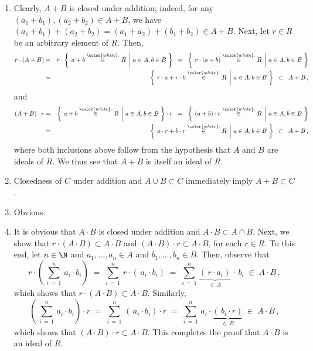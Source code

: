 \begin{enumerate}
\item
	Clearly, $A + B$ is closed under addition;
	indeed, for any $(a_{1} + b_{1}), (a_{2} + b_{2}) \in A + B$,
	we have $(a_{1} + b_{1}) + (a_{2} + b_{2}) = (a_{1} + a_{2}) + (b_{1} + b_{2}) \in A + B$.
	Next, let $r \in R$ be an arbitrary element of $R$. Then,
	\begin{eqnarray*}
	r \cdot (A+B)
	& = &
		r \cdot \left\{\;\left. a + b \overset{{\color{white}.}}{\in} R \;\,\right\vert\, a \in A, b \in B \;\right\}
	\;\; = \;\;
		\left\{\;\left. r \cdot (a + b) \overset{{\color{white}.}}{\in} R \;\,\right\vert\, a \in A, b \in B \;\right\}
	\\
	& = &
		\left\{\;\left. r \cdot a + r \cdot b \overset{{\color{white}.}}{\in} R \;\,\right\vert\, a \in A, b \in B \;\right\}
	\;\; \subset \;\;
		A + B\,,
	\end{eqnarray*}
	and
	\begin{eqnarray*}
	(A+B) \cdot r
	& = &
		\left\{\;\left. a + b \overset{{\color{white}.}}{\in} R \;\,\right\vert\, a \in A, b \in B \;\right\} \cdot r
	\;\; = \;\;
		\left\{\;\left. (a + b) \cdot r \overset{{\color{white}.}}{\in} R \;\,\right\vert\, a \in A, b \in B \;\right\}
	\\
	& = &
		\left\{\;\left. a \cdot r + b \cdot r \overset{{\color{white}.}}{\in} R \;\,\right\vert\, a \in A, b \in B \;\right\}
	\;\; \subset \;\;
		A + B\,,
	\end{eqnarray*}
	where both inclusions above follow from the hypothesis that $A$ and $B$ are ideals of $R$.
	We thus see that $A + B$ is itself an ideal of $R$.
\item
	Closedness of $C$ under addition and $A \cup B \subset C$ immediately imply $A + B \subset C$.
\item
	Obvious.
\item
	It is obvious that $A \cdot B$ is closed under addition and $A \cdot B \subset A \cap B$.
	Next, we show that
	$r \cdot (A \cdot B) \subset A \cdot B$ and
	$(A \cdot B) \cdot r \subset A \cdot B$, for each $r \in R$.
	To this end, let $n \in \N$ and $a_{1}, \ldots , a_{n} \in A$ and $b_{1}, \ldots , b_{n} \in B$.
	Then, observe that
	\begin{equation*}
	r \cdot \left(\, \overset{n}{\underset{i\,=\,1}{\sum}}\, a_{i} \cdot b_{i} \right)
	\; = \;
		\overset{n}{\underset{i\,=\,1}{\sum}}\, r \cdot \left(\, a_{i} \cdot b_{i} \right)
	\; = \;
		\overset{n}{\underset{i\,=\,1}{\sum}}\, \underset{\in\,A}{\underbrace{\left(\, r \cdot a_{i} \right)}} \,\cdot\, b_{i}
	\; \in \;
		A \cdot B\,,
	\end{equation*}
	which shows that $r \cdot (A \cdot B) \subset A \cdot B$.
	Similarly,
	\begin{equation*}
	\left(\, \overset{n}{\underset{i\,=\,1}{\sum}}\, a_{i} \cdot b_{i} \right) \cdot r
	\; = \;
		\overset{n}{\underset{i\,=\,1}{\sum}}\, \left(\, a_{i} \cdot b_{i} \right) \cdot r
	\; = \;
		\overset{n}{\underset{i\,=\,1}{\sum}}\, a_{i} \cdot \underset{\in\,B}{\underbrace{\left(\, b_{i} \cdot r \right)}}
	\; \in \;
		A \cdot B\,,
	\end{equation*}
	which shows that $(A \cdot B) \cdot r \subset A \cdot B$.
	This completes the proof that $A \cdot B$ is an ideal of $R$.
\end{enumerate}
